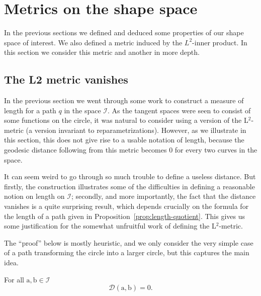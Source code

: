 
\section{Metrics on the shape space}
\label{sec:metrics-shape-space}
In the previous sections we defined and deduced some properties of our shape space of interest. We also defined a metric induced by the $L^2$-inner product. In this section we consider this metric and another in more depth.

\subsection{The L2 metric vanishes}
\label{sec:l2-metric-vanishes}

In the previous section we went through some work to construct a measure of length for a path $q$ in the space $\mathcal{I}$. As the tangent spaces were seen to consist of some functions on the circle, it was natural to consider using a version of the L$^2$-metric (a version invariant to reparametrizations). However, as we illustrate in this section, this does not give rise to a usable notation of length, because the geodesic distance following from this metric becomes 0 for every two curves in the space.

It can seem weird to go through so much trouble to define a useless distance. But firstly, the construction illustrates some of the difficulties in defining a reasonable notion on length on $\mathcal{I}$; secondly, and more importantly, the fact that the distance vanishes is a quite surprising result, which depends crucially on the formula for the length of a path given in Proposition~\ref{prop:length-quotient}. This gives us some justification for the somewhat unfruitful work of defining the L$^2$-metric.

The ``proof'' below is mostly heuristic, and we only consider the very simple case of a path transforming the circle into a larger circle, but this captures the main idea.
\begin{theorem}
  \label{theorem:l2-metric-vanishes}
  For all $\mathrm{a},\mathrm{b} \in \mathcal{I}$
  \begin{equation*}
    \mathcal{D}(\mathrm{a},\mathrm{b}) = 0.
  \end{equation*}
\end{theorem}

